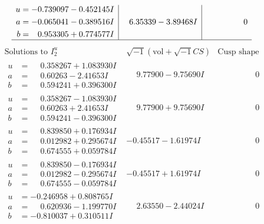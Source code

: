 \documentclass[1p]{elsarticle_modified}
\theoremstyle{definition}
\newcommand{\I}{\sqrt{-1}}
\begin{document}
$$\begin{array}{c|c|c}
\begin{aligned}
u &= -0.739097 - 0.452145 I \\
a &= -0.065041 - 0.389516 I \\
b &= \phantom{-}0.953305 + 0.774577 I\end{aligned}
 & \phantom{-}6.35339 - 3.89468 I & \phantom{-0.000000 } 0\\
 \hline 
 \end{array}$$\newpage$$\begin{array}{c|c|c}  
\text{Solutions to }I^u_{2}& \I (\text{vol} + \sqrt{-1}CS) & \text{Cusp shape}\\
 \hline 
\begin{aligned}
u &= \phantom{-}0.358267 + 1.083930 I \\
a &= \phantom{-}0.60263 - 2.41653 I \\
b &= \phantom{-}0.594241 + 0.396300 I\end{aligned}
 & \phantom{-}9.77900 - 9.75690 I & \phantom{-0.000000 } 0 \\ \hline\begin{aligned}
u &= \phantom{-}0.358267 - 1.083930 I \\
a &= \phantom{-}0.60263 + 2.41653 I \\
b &= \phantom{-}0.594241 - 0.396300 I\end{aligned}
 & \phantom{-}9.77900 + 9.75690 I & \phantom{-0.000000 } 0 \\ \hline\begin{aligned}
u &= \phantom{-}0.839850 + 0.176934 I \\
a &= \phantom{-}0.012982 + 0.295674 I \\
b &= \phantom{-}0.674555 + 0.059784 I\end{aligned}
 & -0.45517 - 1.61974 I & \phantom{-0.000000 } 0 \\ \hline\begin{aligned}
u &= \phantom{-}0.839850 - 0.176934 I \\
a &= \phantom{-}0.012982 - 0.295674 I \\
b &= \phantom{-}0.674555 - 0.059784 I\end{aligned}
 & -0.45517 + 1.61974 I & \phantom{-0.000000 } 0 \\ \hline\begin{aligned}
u &= -0.246958 + 0.808765 I \\
a &= \phantom{-}0.620936 - 1.199770 I \\
b &= -0.810037 + 0.310511 I\end{aligned}
 & \phantom{-}2.63550 - 2.44024 I & \phantom{-0.000000 } 0 \\ \hline\begin{aligned}

\end{aligned}
\end{array}$$
\end{document}
